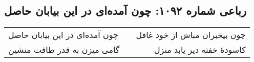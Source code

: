 \begin{center}
\section*{رباعی شماره ۱۰۹۲: چون آمده‌ای در این بیابان حاصل}
\label{sec:1092}
\begin{longtable}{l p{0.5cm} r}
چون آمده‌ای در این بیابان حاصل
&&
چون بیخبران مباش از خود غافل
\\
گامی میزن به قدر طاقت منشین
&&
کاسودهٔ خفته دیر یابد منزل
\\
\end{longtable}
\end{center}
